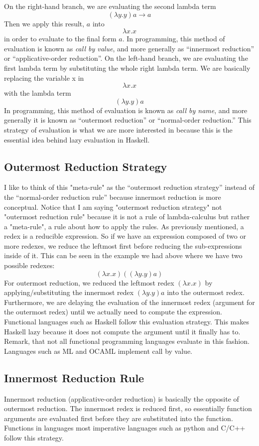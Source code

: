 \documentclass{article}
\begin{document}
\medskip\noindent On the right-hand branch, we are evaluating the second lambda term $$(\lambda y.y)a \rightarrow  a$$ Then we apply this result, $a$ into $$\lambda x.x$$ in order to evaluate to the final form $a$. In programming, this method of evaluation is known as \textit{call by value}, and more generally as “innermost reduction” or “applicative-order reduction”.
\newline
\newline On the left-hand branch, we are evaluating the first lambda term by substituting the whole right lambda term. We are basically replacing the variable x in $$\lambda x.x$$ with the lambda term $$(\lambda y.y)a$$ In programming, this method of evaluation is known as \textit{call by name}, and more generally it is known as “outermost reduction” or “normal-order reduction.” This strategy of evaluation is what we are more interested in because this is the essential idea behind lazy evaluation in Haskell.

\subsection{Outermost Reduction Strategy}
\medskip\noindent
I like to think of this "meta-rule" as the “outermost reduction strategy” instead of the “normal-order reduction rule” because innermost reduction is more conceptual. Notice that I am saying "outermost reduction strategy" not "outermost reduction rule" because it is not a rule of lambda-calculus but rather a "meta-rule", a rule about how to apply the rules. As previously mentioned, a redex is a reducible expression. So if we have an expression composed of two or more redexes, we reduce the leftmost first before reducing the sub-expressions inside of it. This can be seen in the example we had above where we have two possible redexes: $$(\lambda x.x) ((\lambda y.y) a)$$
For outermost reduction, we reduced the leftmost redex $(\lambda x.x)$ by applying/substituting the innermost redex $(\lambda y.y)a$ into the outermost redex. Furthermore, we are delaying the evaluation of the innermost redex (argument for the outermost redex) until we actually need to compute the expression. Functional languages such as Haskell follow this evaluation strategy. This makes Haskell lazy because it does not compute the argument until it finally has to. Remark, that not all functional programming languages evaluate in this fashion. Languages such as ML and OCAML implement call by value.


\subsection{Innermost Reduction Rule}
\medskip\noindent
Innermost reduction (applicative-order reduction) is basically the opposite of outermost reduction. The innermost redex is reduced first, so essentially function arguments are evaluated first before they are substituted into the function. Functions in languages most imperative languages such as python and C/C++ follow this strategy. 
\end{document}
